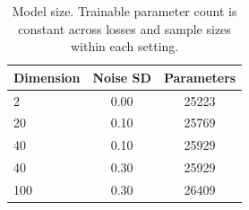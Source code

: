 \begin{table}[t]
\centering
\small
\setlength{\tabcolsep}{4pt}
\caption{Model size. Trainable parameter count is constant across losses and sample sizes within each setting.}
\label{tab:sim-model-size}
\begin{tabular}{lcc}
\toprule
Dimension & Noise SD & Parameters \\
\midrule
2 & 0.00 & 25223 \\
20 & 0.10 & 25769 \\
40 & 0.10 & 25929 \\
40 & 0.30 & 25929 \\
100 & 0.30 & 26409 \\
\bottomrule
\end{tabular}
\end{table}
